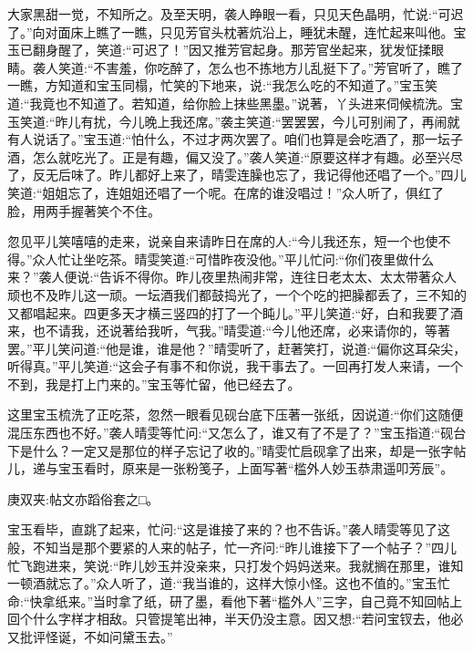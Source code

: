 \begin{parag}
    大家黑甜一觉，不知所之。及至天明，袭人睁眼一看，只见天色晶明，忙说:“可迟了。”向对面床上瞧了一瞧，只见芳官头枕著炕沿上，睡犹未醒，连忙起来叫他。宝玉已翻身醒了，笑道:“可迟了！”因又推芳官起身。那芳官坐起来，犹发怔揉眼睛。袭人笑道:“不害羞，你吃醉了，怎么也不拣地方儿乱挺下了。”芳官听了，瞧了一瞧，方知道和宝玉同榻，忙笑的下地来，说:“我怎么吃的不知道了。”宝玉笑道:“我竟也不知道了。若知道，给你脸上抹些黑墨。”说著，丫头进来伺候梳洗。宝玉笑道:“昨儿有扰，今儿晚上我还席。”袭主笑道:“罢罢罢，今儿可别闹了，再闹就有人说话了。”宝玉道:“怕什么，不过才两次罢了。咱们也算是会吃酒了，那一坛子酒，怎么就吃光了。正是有趣，偏又没了。”袭人笑道:“原要这样才有趣。必至兴尽了，反无后味了。昨儿都好上来了，晴雯连臊也忘了，我记得他还唱了一个。”四儿笑道:“姐姐忘了，连姐姐还唱了一个呢。在席的谁没唱过！”众人听了，俱红了脸，用两手握著笑个不住。
\end{parag}


\begin{parag}
    忽见平儿笑嘻嘻的走来，说亲自来请昨日在席的人:“今儿我还东，短一个也使不得。”众人忙让坐吃茶。晴雯笑道:“可惜昨夜没他。”平儿忙问:“你们夜里做什么来？”袭人便说:“告诉不得你。昨儿夜里热闹非常，连往日老太太、太太带著众人顽也不及昨儿这一顽。一坛酒我们都鼓捣光了，一个个吃的把臊都丢了，三不知的又都唱起来。四更多天才横三竖四的打了一个盹儿。”平儿笑道:“好，白和我要了酒来，也不请我，还说著给我听，气我。”晴雯道:“今儿他还席，必来请你的，等著罢。”平儿笑问道:“他是谁，谁是他？”晴雯听了，赶著笑打，说道:“偏你这耳朵尖，听得真。”平儿笑道:“这会子有事不和你说，我干事去了。一回再打发人来请，一个不到，我是打上门来的。”宝玉等忙留，他已经去了。
\end{parag}


\begin{parag}
    这里宝玉梳洗了正吃茶，忽然一眼看见砚台底下压著一张纸，因说道:“你们这随便混压东西也不好。”袭人晴雯等忙问:“又怎么了，谁又有了不是了？”宝玉指道:“砚台下是什么？一定又是那位的样子忘记了收的。”晴雯忙启砚拿了出来，却是一张字帖儿，递与宝玉看时，原来是一张粉笺子，上面写著“槛外人妙玉恭肃遥叩芳辰”。\begin{note}庚双夹:帖文亦蹈俗套之□。\end{note}宝玉看毕，直跳了起来，忙问:“这是谁接了来的？也不告诉。”袭人晴雯等见了这般，不知当是那个要紧的人来的帖子，忙一齐问:“昨儿谁接下了一个帖子？”四儿忙飞跑进来，笑说:“昨儿妙玉并没亲来，只打发个妈妈送来。我就搁在那里，谁知一顿酒就忘了。”众人听了，道:“我当谁的，这样大惊小怪。这也不值的。”宝玉忙命:“快拿纸来。”当时拿了纸，研了墨，看他下著“槛外人”三字，自己竟不知回帖上回个什么字样才相敌。只管提笔出神，半天仍没主意。因又想:“若问宝钗去，他必又批评怪诞，不如问黛玉去。”
\end{parag}


